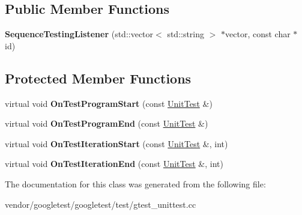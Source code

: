 \subsection*{Public Member Functions}
\begin{DoxyCompactItemize}
\item 
\mbox{\label{class_sequence_testing_listener_ac0fcb350d20876f8273621ad4c79ba7a}} 
{\bfseries Sequence\+Testing\+Listener} (std\+::vector$<$ std\+::string $>$ $\ast$vector, const char $\ast$id)
\end{DoxyCompactItemize}
\subsection*{Protected Member Functions}
\begin{DoxyCompactItemize}
\item 
\mbox{\label{class_sequence_testing_listener_a25b96acdbaa6f582e583e6b56bd39b42}} 
virtual void {\bfseries On\+Test\+Program\+Start} (const \mbox{\hyperlink{classtesting_1_1_unit_test}{Unit\+Test}} \&)
\item 
\mbox{\label{class_sequence_testing_listener_aacac5e15bac089460841ff63a5c31f57}} 
virtual void {\bfseries On\+Test\+Program\+End} (const \mbox{\hyperlink{classtesting_1_1_unit_test}{Unit\+Test}} \&)
\item 
\mbox{\label{class_sequence_testing_listener_a345641262fa10cc4b251ac54116db74b}} 
virtual void {\bfseries On\+Test\+Iteration\+Start} (const \mbox{\hyperlink{classtesting_1_1_unit_test}{Unit\+Test}} \&, int)
\item 
\mbox{\label{class_sequence_testing_listener_a783bc01e2a95f5bf73bbde4d96832e0f}} 
virtual void {\bfseries On\+Test\+Iteration\+End} (const \mbox{\hyperlink{classtesting_1_1_unit_test}{Unit\+Test}} \&, int)
\end{DoxyCompactItemize}


The documentation for this class was generated from the following file\+:\begin{DoxyCompactItemize}
\item 
vendor/googletest/googletest/test/gtest\+\_\+unittest.\+cc\end{DoxyCompactItemize}

